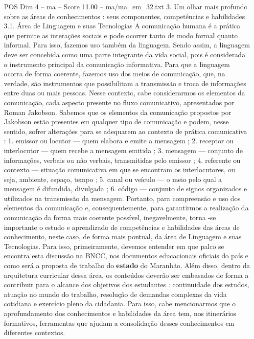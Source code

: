 \begin{textsample}{POS Dim 4 – ma – Score 11.00 – ma/ma\_em\_32.txt}  \label{ex:f4_pos_058}
3.
Um olhar mais profundo sobre as áreas de conhecimentos : seus componentes, competências e habilidades 3.1.
Área de Linguagem e suas Tecnologias A comunicação humana é a prática que permite as interações sociais e pode ocorrer tanto de modo formal quanto informal.
Para isso, fazemos uso também da linguagem.
Sendo assim, a linguagem deve ser concebida como uma parte integrante da vida social, pois é considerada o instrumento principal da comunicação informativa.
Para que a linguagem ocorra de forma coerente, fazemos uso dos meios de comunicação, que, na verdade, são instrumentos que possibilitam a transmissão e troca de informações entre duas ou mais pessoas.
Nesse contexto, cabe considerarmos os elementos da comunicação, cada aspecto presente no fluxo comunicativo, apresentados por Roman Jakobson.
Sabemos que os elementos da comunicação propostos por Jakobson estão presentes em qualquer tipo de comunicação e podem, nesse sentido, sofrer alterações para se adequarem ao contexto de prática comunicativa : 1. emissor ou locutor — quem elabora e emite a mensagem ; 2. receptor ou interlocutor — quem recebe a mensagem emitida ; 3. mensagem — conjunto de informações, verbais ou não verbais, transmitidas pelo emissor ; 4. referente ou contexto — situação comunicativa em que se encontram os interlocutores, ou seja, ambiente, espaço, tempo ; 5. canal ou veículo — o meio pelo qual a mensagem é difundida, divulgada ; 6. código — conjunto de signos organizados e utilizados na transmissão da mensagem.
Portanto, para compreensão e uso dos elementos da comunicação e, consequentemente, para garantirmos a realização da comunicação da forma mais coerente possível, inegavelmente, torna -se importante o estudo e aprendizado de competências e habilidades das áreas de conhecimento, neste caso, de forma mais pontual, da área de Linguagem e suas Tecnologias.
Para isso, primeiramente, devemos entender em que palco se encontra esta discussão na BNCC, nos documentos educacionais oficiais do país e como será a proposta de trabalho do \textbf{estado} do Maranhão.
Além disso, dentro da arquitetura curricular dessa área, os conteúdos deverão ser embasados de forma a contribuir para o alcance dos objetivos dos estudantes : continuidade dos estudos, atuação no mundo do trabalho, resolução de demandas complexas da vida cotidiana e exercício pleno da cidadania.
Para isso, cabe mencionarmos que o aprofundamento dos conhecimentos e habilidades da área tem, nos itinerários formativos, ferramentas que ajudam a consolidação desses conhecimentos em diferentes contextos.

\end{textsample}
